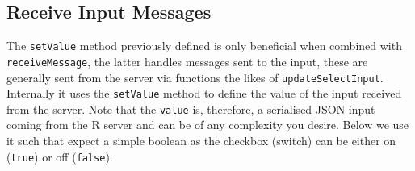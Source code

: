 \documentclass[10pt,]{krantz}
\makeatletter
\newenvironment{Shaded}{\begin{snugshade}}{\end{snugshade}}
\newcommand{\AttributeTok}[1]{\textcolor[rgb]{0.61,0.61,0.61}{#1}}
\newcommand{\CommentTok}[1]{\textcolor[rgb]{0.37,0.37,0.37}{\textit{#1}}}
\newcommand{\ControlFlowTok}[1]{\textcolor[rgb]{0.27,0.27,0.27}{\textbf{#1}}}
\newcommand{\DataTypeTok}[1]{\textcolor[rgb]{0.27,0.27,0.27}{#1}}
\newcommand{\KeywordTok}[1]{\textcolor[rgb]{0.27,0.27,0.27}{\textbf{#1}}}
\newcommand{\NormalTok}[1]{#1}
\newcommand{\OperatorTok}[1]{\textcolor[rgb]{0.43,0.43,0.43}{\textbf{#1}}}
\newcommand{\StringTok}[1]{\textcolor[rgb]{0.5,0.5,0.5}{#1}}
\newcommand{\VariableTok}[1]{\textcolor[rgb]{0,0,0}{#1}}
\newenvironment{kframe}{%
\medskip{}
\setlength{\fboxsep}{.8em}
 \def\at@end@of@kframe{}%
 \ifinner\ifhmode%
  \def\at@end@of@kframe{\end{minipage}}%
  \begin{minipage}{\columnwidth}%
 \fi\fi%
 \def\FrameCommand##1{\hskip\@totalleftmargin \hskip-\fboxsep
 \colorbox{shadecolor}{##1}\hskip-\fboxsep
     \hskip-\linewidth \hskip-\@totalleftmargin \hskip\columnwidth}%
 \MakeFramed {\advance\hsize-\width
   \@totalleftmargin\z@ \linewidth\hsize
   \@setminipage}}%
 {\par\unskip\endMakeFramed%
 \at@end@of@kframe}
\renewenvironment{Shaded}{\begin{kframe}}{\end{kframe}}
\makeatother
\begin{document}
\hypertarget{shiny-input-receive-msg}{%
\subsection{Receive Input Messages}\label{shiny-input-receive-msg}}

The \texttt{setValue} method previously defined is only beneficial when combined with \texttt{receiveMessage}, the latter handles messages sent to the input, these are generally sent from the server via functions the likes of \texttt{updateSelectInput}. Internally it uses the \texttt{setValue} method to define the value of the input received from the server. Note that the \texttt{value} is, therefore, a serialised JSON input coming from the R server and can be of any complexity you desire. Below we use it such that expect a simple boolean as the checkbox (switch) can be either on (\texttt{true}) or off (\texttt{false}).

\begin{Shaded}
\end{Shaded}
\end{document}
